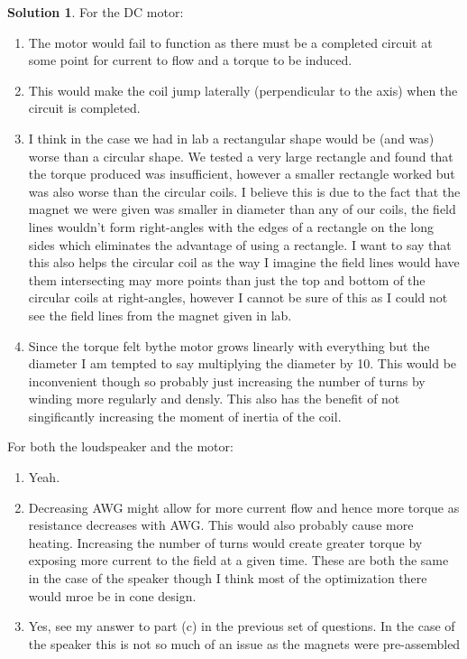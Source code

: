\documentclass[10pt]{article}
\theoremstyle{definition}
\newtheorem{soln}{Solution}
\begin{document}
\begin{soln}
  For the DC motor:
  \begin{enumerate}[label=(\alph*)]
    \item The motor would fail to function as there must be a completed circuit at some point for current to flow and a torque to be induced.
    \item This would make the coil jump laterally (perpendicular to the axis) when the circuit is completed.
    \item I think in the case we had in lab a rectangular shape would be (and was) worse than a circular shape. We tested a very large rectangle and found that the
          torque produced was insufficient, however a smaller rectangle worked but was also worse than the circular coils. I believe this is due to the fact
          that the magnet we were given was smaller in diameter than any of our coils, the field lines wouldn't form right-angles with the edges of a rectangle on the long sides
          which eliminates the advantage of using a rectangle. I want to say that this also helps the circular coil as the way I imagine the field lines would have them intersecting
          may more points than just the top and bottom of the circular coils at right-angles, however I cannot be sure of this as I could not see the field lines from the
          magnet given in lab.
    \item Since the torque felt bythe motor grows linearly with everything but the diameter I am tempted to say multiplying the diameter by 10. This
          would be inconvenient though so probably just increasing the number of turns by winding more regularly and densly. This also has the benefit of not singificantly
          increasing the moment of inertia of the coil.
  \end{enumerate}
  For both the loudspeaker and the motor:
  \begin{enumerate}[label=(\alph*)]
    \item Yeah.
    \item Decreasing AWG might allow for more current flow and hence more torque as resistance decreases with AWG. This would also probably cause more heating.
          Increasing the number of turns would create greater torque by exposing more current to the field at a given time. These are both the same in the case of the speaker though I think
          most of the optimization there would mroe be in cone design.
    \item Yes, see my answer to part (c) in the previous set of questions. In the case of the speaker this is not so much of an issue as the magnets were pre-assembled 

\end{enumerate}
\end{soln}
\end{document}
